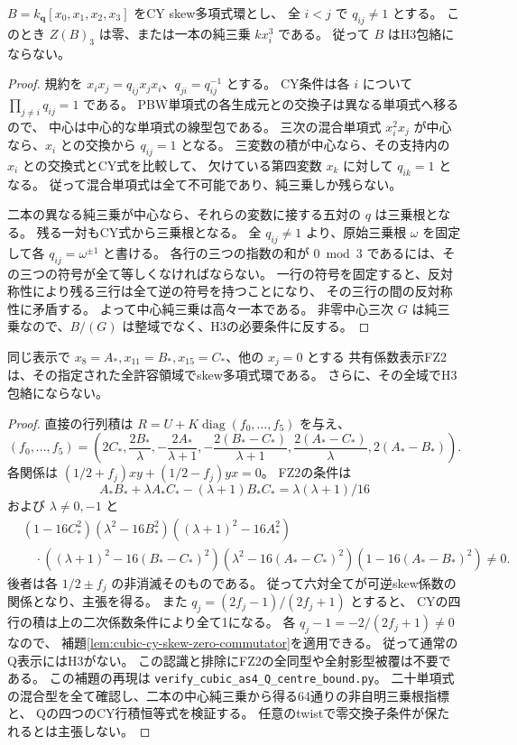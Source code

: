 \begin{lemma}\label{lem:cubic-cy-skew-zero-commutator}
$B=k_{\mathbf q}[x_0,x_1,x_2,x_3]$ をCY skew多項式環とし、
全 $i<j$ で $q_{ij}\ne1$ とする。
このとき $Z(B)_3$ は零、または一本の純三乗 $kx_i^3$ である。
従って $B$ はH3包絡にならない。
\end{lemma}
\begin{proof}
規約を $x_i x_j=q_{ij}x_jx_i$、$q_{ji}=q_{ij}^{-1}$ とする。
CY条件は各 $i$ について $\prod_{j\ne i}q_{ij}=1$ である。
PBW単項式の各生成元との交換子は異なる単項式へ移るので、
中心は中心的な単項式の線型包である。
三次の混合単項式 $x_i^2x_j$ が中心なら、$x_i$ との交換から $q_{ij}=1$ となる。
三変数の積が中心なら、その支持内の $x_i$ との交換式とCY式を比較して、
欠けている第四変数 $x_k$ に対して $q_{ik}=1$ となる。
従って混合単項式は全て不可能であり、純三乗しか残らない。

二本の異なる純三乗が中心なら、それらの変数に接する五対の $q$ は三乗根となる。
残る一対もCY式から三乗根となる。
全 $q_{ij}\ne1$ より、原始三乗根 $\omega$ を固定して各 $q_{ij}=\omega^{\pm1}$ と書ける。
各行の三つの指数の和が $0\bmod3$ であるには、その三つの符号が全て等しくなければならない。
一行の符号を固定すると、反対称性により残る三行は全て逆の符号を持つことになり、
その三行の間の反対称性に矛盾する。
よって中心純三乗は高々一本である。
非零中心三次 $G$ は純三乗なので、$B/(G)$ は整域でなく、H3の必要条件に反する。
\end{proof}

\begin{proposition}\label{prop:cubic-fs-shared-skew}
同じ表示で $x_8=A_*,x_{11}=B_*,x_{15}=C_*$、他の $x_j=0$ とする
共有係数表示FZ2は、その指定された全許容領域でskew多項式環である。
さらに、その全域でH3包絡にならない。
\end{proposition}
\begin{proof}
直接の行列積は $R=U+K\operatorname{diag}(f_0,\ldots,f_5)$ を与え、
\[
 (f_0,\ldots,f_5)=\left(2C_*,\frac{2B_*}{\lambda},
 -\frac{2A_*}{\lambda+1},-\frac{2(B_*-C_*)}{\lambda+1},
 \frac{2(A_*-C_*)}{\lambda},2(A_*-B_*)\right).
\]
各関係は $(1/2+f_j)xy+(1/2-f_j)yx=0$。
FZ2の条件は
\[
 A_*B_*+\lambda A_*C_*-(\lambda+1)B_*C_*
 =\lambda(\lambda+1)/16
\]
および $\lambda\ne0,-1$ と
\begin{align*}
 &(1-16C_*^2)(\lambda^2-16B_*^2)((\lambda+1)^2-16A_*^2)\\
 &\quad\cdot((\lambda+1)^2-16(B_*-C_*)^2)
 (\lambda^2-16(A_*-C_*)^2)(1-16(A_*-B_*)^2)\ne0.
\end{align*}
後者は各 $1/2\pm f_j$ の非消滅そのものである。
従って六対全てが可逆skew係数の関係となり、主張を得る。
また $q_j=(2f_j-1)/(2f_j+1)$ とすると、
CYの四行の積は上の二次係数条件により全て1になる。
各 $q_j-1=-2/(2f_j+1)\ne0$ なので、
補題\ref{lem:cubic-cy-skew-zero-commutator}を適用できる。
従って通常のQ表示にはH3がない。
この認識と排除にFZ2の全同型や全射影型被覆は不要である。
この補題の再現は
\texttt{verify\_\allowbreak{}cubic\_\allowbreak{}as4\_\allowbreak{}Q\_\allowbreak{}centre\_\allowbreak{}bound.py}。
二十単項式の混合型を全て確認し、二本の中心純三乗から得る64通りの非自明三乗根指標と、
Qの四つのCY行積恒等式を検証する。
任意のtwistで零交換子条件が保たれるとは主張しない。
\end{proof}

